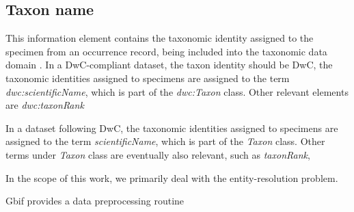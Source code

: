\subsection{Taxon name}
This information element contains the taxonomic identity assigned to the specimen from an occurrence record, being included into the taxonomic data domain \cite{Dalcin2005}.
In a DwC-compliant dataset, the taxon identity should be  DwC, the taxonomic identities assigned to specimens are assigned to the term \textit{dwc:scientificName}, which is part of the \textit{dwc:Taxon} class.
Other relevant elements are \textit{dwc:taxonRank}






In a dataset following DwC, the taxonomic identities assigned to specimens are assigned to the term \textit{scientificName}, which is part of the \textit{Taxon} class.
Other terms under \textit{Taxon} class are eventually also relevant, such as \textit{taxonRank},



In the scope of this work, we primarily deal with the entity-resolution problem.




Gbif provides a data preprocessing routine %




















